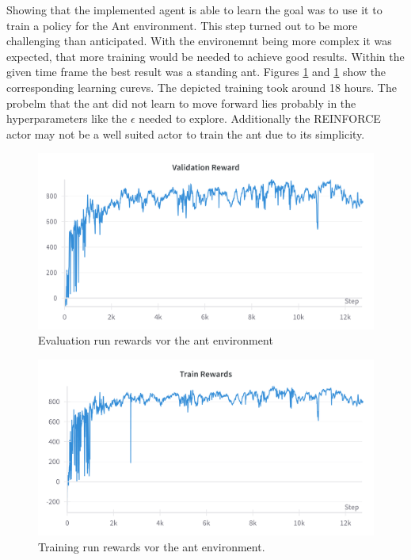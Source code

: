 \documentclass[11pt, a4paper]{article}
\begin{document}
Showing that the implemented agent is able to learn the goal was to use it to train a policy 
for the Ant environment.
This step turned out to be more challenging than anticipated. 
With the environemnt being more complex it was expected, that more training would be 
needed to achieve good results.
Within the given time frame the best result was a standing ant.
Figures \ref{REIN:ant_eval} and \ref{REIN:ant_eval} show the corresponding learning curevs.
The depicted training took around 18 hours.
The probelm that the ant did not learn to move forward lies probably in the hyperparameters like the 
$\epsilon$ needed to explore. Additionally the REINFORCE actor may not be a well suited actor to 
train the ant due to its simplicity.
\begin{figure}
    \centering
    \includegraphics[width=13cm]{reinforce_ant_val.png}
    \caption{Evaluation run rewards vor the ant environment}
    \label{REIN:ant_eval}
\end{figure}

\begin{figure}
    \centering
    \includegraphics[width=13cm]{reinforce_ant_train.png}
    \caption{Training run rewards vor the ant environment.}
    \label{REIN:ant_tra}
\end{figure}
\end{document}
